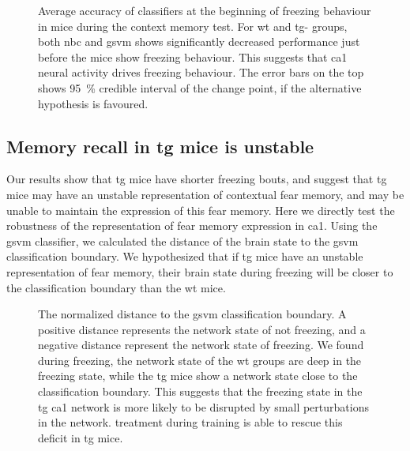 \begin{figure}[h]
    \begin{subfigure}[h]{\textwidth}
        
        \caption{\label{f.ad.nb_into_f}}
    \end{subfigure}
    \begin{subfigure}[h]{\textwidth}
        
        \caption{\label{f.ad.svm_into_f}}
    \end{subfigure}
    \caption[Average accuracy of classifiers at initiation of freezing behaviour.]{Average accuracy of classifiers at the beginning of freezing behaviour in mice during the context memory test. For \gls{wt} and \gls{tg}-\glu{} groups, both \gls{nbc} and \gls{gsvm} shows significantly decreased performance just before the mice show freezing behaviour. This suggests that \gls{ca1} neural activity drives freezing behaviour. The error bars on the top shows \SI{95}{\percent} credible interval of the change point, if the alternative hypothesis is favoured. \label{f.ad.into_f}}
\end{figure}

\subsection{Memory recall in \gls{tg} mice is unstable}
Our results show that \gls{tg} mice have shorter freezing bouts, and suggest that \gls{tg} mice may have an unstable representation of contextual fear memory, and may be unable to maintain the expression of this fear memory. Here we directly test the robustness of the representation of fear memory expression in \gls{ca1}. Using the \gls{gsvm} classifier, we calculated the distance of the brain state to the \gls{gsvm} classification boundary. We hypothesized that if \gls{tg} mice have an unstable representation of fear memory, their brain state during freezing will be closer to the classification boundary than the \gls{wt} mice. 

\begin{figure}[h]
    
    \caption[Normalized distance to the \gls{gsvm} classification boundary.]{The normalized distance to the \gls{gsvm} classification boundary. A positive distance represents the network state of not freezing, and a negative distance represent the network state of freezing. We found during freezing, the network state of the \gls{wt} groups are deep in the freezing state, while the \gls{tg} mice show a network state close to the classification boundary. This suggests that the freezing state in the \gls{tg} \gls{ca1} network is more likely to be disrupted by small perturbations in the network. \tglu{} treatment during training is able to rescue this deficit in \gls{tg} mice. \label{f.ad.cls-distance}}
\end{figure}

